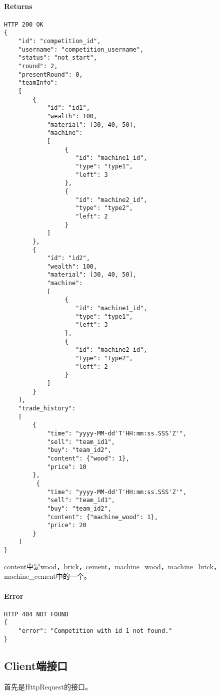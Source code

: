 \documentclass{article}
\begin{document}
\paragraph*{Returns}
\begin{lstlisting}
HTTP 200 OK
{
    "id": "competition_id",
    "username": "competition_username",
    "status": "not_start",
    "round": 2,
    "presentRound": 0,
    "teamInfo":
    [
        {
            "id": "id1",
            "wealth": 100,
            "material": [30, 40, 50],
            "machine":
            [
                 {
                    "id": "machine1_id",
                    "type": "type1",
                    "left": 3
                 },
                 {
                    "id": "machine2_id",
                    "type": "type2",
                    "left": 2
                 }
            ]
        },
        {
            "id": "id2",
            "wealth": 100,
            "material": [30, 40, 50],
            "machine":
            [
                 {
                    "id": "machine1_id",
                    "type": "type1",
                    "left": 3
                 },
                 {
                    "id": "machine2_id",
                    "type": "type2",
                    "left": 2
                 }
            ]
        }
    ],
    "trade_history":
    [
        {
            "time": "yyyy-MM-dd'T'HH:mm:ss.SSS'Z'",
            "sell": "team_id1",
            "buy": "team_id2",
            "content": {"wood": 1},
            "price": 10
        },
         {
            "time": "yyyy-MM-dd'T'HH:mm:ss.SSS'Z'",
            "sell": "team_id1",
            "buy": "team_id2",
            "content": {"machine_wood": 1},
            "price": 20
        }
    ]
}

\end{lstlisting}
content中是wood，brick，cement，machine\_wood，machine\_brick，machine\_cement中的一个。

\paragraph*{Error}
\begin{lstlisting}
HTTP 404 NOT FOUND
{
    "error": "Competition with id 1 not found."
}
\end{lstlisting}

\subsection{Client端接口}
首先是HttpRequest的接口。
\end{document}
